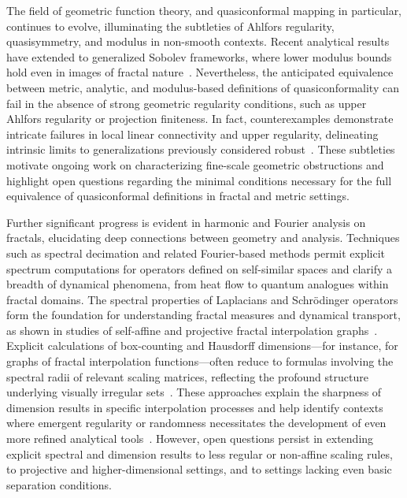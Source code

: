 \documentclass[sigconf]{acmart}
\begin{document}
The field of geometric function theory, and quasiconformal mapping in particular, continues to evolve, illuminating the subtleties of Ahlfors regularity, quasisymmetry, and modulus in non-smooth contexts. Recent analytical results have extended to generalized Sobolev frameworks, where lower modulus bounds hold even in images of fractal nature~\cite{ref47}. Nevertheless, the anticipated equivalence between metric, analytic, and modulus-based definitions of quasiconformality can fail in the absence of strong geometric regularity conditions, such as upper Ahlfors regularity or projection finiteness. In fact, counterexamples demonstrate intricate failures in local linear connectivity and upper regularity, delineating intrinsic limits to generalizations previously considered robust~\cite{ref47}. These subtleties motivate ongoing work on characterizing fine-scale geometric obstructions and highlight open questions regarding the minimal conditions necessary for the full equivalence of quasiconformal definitions in fractal and metric settings.

Further significant progress is evident in harmonic and Fourier analysis on fractals, elucidating deep connections between geometry and analysis. Techniques such as spectral decimation and related Fourier-based methods permit explicit spectrum computations for operators defined on self-similar spaces and clarify a breadth of dynamical phenomena, from heat flow to quantum analogues within fractal domains. The spectral properties of Laplacians and Schrödinger operators form the foundation for understanding fractal measures and dynamical transport, as shown in studies of self-affine and projective fractal interpolation graphs~\cite{ref28,ref32,ref33,ref34}. Explicit calculations of box-counting and Hausdorff dimensions---for instance, for graphs of fractal interpolation functions---often reduce to formulas involving the spectral radii of relevant scaling matrices, reflecting the profound structure underlying visually irregular sets~\cite{ref27,ref28,ref32,ref33,ref34}. These approaches explain the sharpness of dimension results in specific interpolation processes and help identify contexts where emergent regularity or randomness necessitates the development of even more refined analytical tools~\cite{ref32,ref33}. However, open questions persist in extending explicit spectral and dimension results to less regular or non-affine scaling rules, to projective and higher-dimensional settings, and to settings lacking even basic separation conditions.
\end{document}
